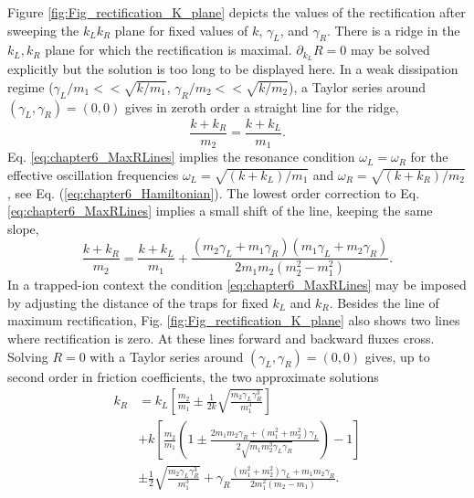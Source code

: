 Figure \ref{fig:Fig_rectification_K_plane} depicts the values of the rectification after sweeping the $k_L k_R$ plane for fixed values of $k$, $\gamma_L$, and $\gamma_R$. There is a ridge in the $k_L,k_R$ plane for which the rectification is maximal. $\partial_{k_L}R = 0$ may be
solved explicitly but the solution is too long to be displayed here. In a weak dissipation regime
(${\gamma_L}/{m_1}<<\sqrt{{k}/{m_1}}$, ${\gamma_R}/{m_2}<<\sqrt{{k}/{m_2}}$), a Taylor series around $(\gamma_L,\gamma_R) = (0,0)$ gives in zeroth order
a straight line for the ridge,
%
\begin{equation}
  \frac{k+k_R}{m_2} = \frac{k+k_L}{m_1}.
  \label{eq:chapter6_MaxRLines}
\end{equation}
%
Eq. \eqref{eq:chapter6_MaxRLines} implies the resonance condition $\omega_L = \omega_R$
for the effective oscillation frequencies $\omega_L = \sqrt{{(k+k_L)}/{m_1}}$ and $\omega_R = \sqrt{{(k+k_R)}/{m_2}}$,
see Eq. (\ref{eq:chapter6_Hamiltonian}). The lowest order correction to  Eq. \eqref{eq:chapter6_MaxRLines} implies a small shift of the line,
keeping the same slope,
%
\begin{equation}
  \frac{k+k_R}{m_2} = \frac{k+k_L}{m_1} + \frac{(m_2\gamma_L+m_1\gamma_R)(m_1\gamma_L+m_2\gamma_R)}{2m_1m_2(m_2^2-m_1^2)}.
  \label{eq:chapter6_MaxRLines_correction}
\end{equation}
%
In a trapped-ion context the condition \eqref{eq:chapter6_MaxRLines} may be imposed by adjusting the distance of the traps for fixed $k_L$ and $k_R$. Besides the line of maximum rectification, Fig. \ref{fig:Fig_rectification_K_plane} also shows two lines where rectification is zero.
At these lines forward and backward fluxes cross.
Solving $R=0$ with a Taylor series around $(\gamma_L,\gamma_R) = (0,0)$ gives, up to second order in friction coefficients,  the two approximate solutions
%
\begin{align}
k_R &= k_L\left[\frac{m_2}{m_1}\pm\frac{1}{2k}\sqrt{\frac{m_2\gamma_L\gamma_R^3}{m_1^3}}\right]
\nonumber\\
&+k\left[\frac{m_2}{m_1}\left(1\pm \frac{ 2 m_1 m_2 \gamma_R + (m_1^2 + m_2^2)\gamma_L }{2\sqrt{m_1 m_2^3 \gamma_L \gamma_R}} \right)-1\right]
\nonumber\\
&\pm\frac{1}{2}\sqrt{\frac{m_2\gamma_L\gamma_R^3}{m_1^3}} + \gamma_R\frac{(m_1^2+m_2^2)\gamma_L + m_1m_2\gamma_R}{2m_1^2(m_2-m_1)}.
\label{eq:chapter6_zeroRlines}
\end{align}
